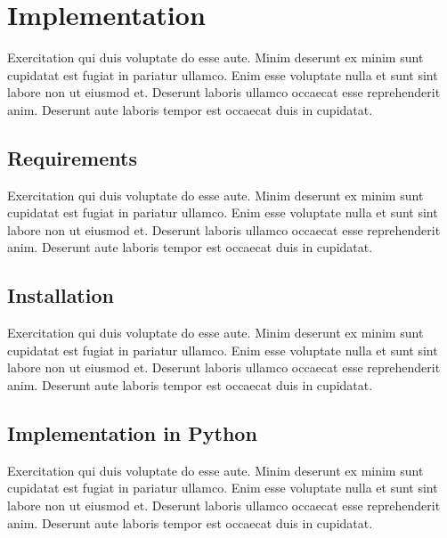 
\section{Implementation} \label{sec:implementationNeo4j}

Exercitation qui duis voluptate do esse aute. Minim deserunt ex minim sunt cupidatat est fugiat in pariatur ullamco. Enim esse voluptate nulla et sunt sint labore non ut eiusmod et. Deserunt laboris ullamco occaecat esse reprehenderit anim. Deserunt aute laboris tempor est occaecat duis in cupidatat.

\subsection{Requirements} \label{subsec:requirementsNeo4j}

Exercitation qui duis voluptate do esse aute. Minim deserunt ex minim sunt cupidatat est fugiat in pariatur ullamco. Enim esse voluptate nulla et sunt sint labore non ut eiusmod et. Deserunt laboris ullamco occaecat esse reprehenderit anim. Deserunt aute laboris tempor est occaecat duis in cupidatat.

\subsection{Installation} \label{subsec:installationNeo4j}

Exercitation qui duis voluptate do esse aute. Minim deserunt ex minim sunt cupidatat est fugiat in pariatur ullamco. Enim esse voluptate nulla et sunt sint labore non ut eiusmod et. Deserunt laboris ullamco occaecat esse reprehenderit anim. Deserunt aute laboris tempor est occaecat duis in cupidatat.

\subsection{Implementation in Python} \label{subsec:implementationPythonNeo4j}

Exercitation qui duis voluptate do esse aute. Minim deserunt ex minim sunt cupidatat est fugiat in pariatur ullamco. Enim esse voluptate nulla et sunt sint labore non ut eiusmod et. Deserunt laboris ullamco occaecat esse reprehenderit anim. Deserunt aute laboris tempor est occaecat duis in cupidatat.

